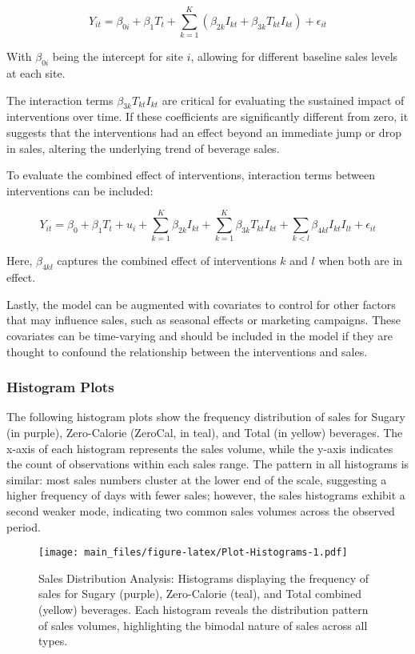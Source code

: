 \documentclass[
]{article}
\begin{document}
\[Y_{it} = \beta_{0i} + \beta_1 T_t + \sum_{k=1}^{K} (\beta_{2k} I_{kt} + \beta_{3k} T_{kt} I_{kt}) + \epsilon_{it} \]

With \(\beta_{0i}\) being the intercept for site \(i\), allowing for
different baseline sales levels at each site.

The interaction terms \(\beta_{3k} T_{kt} I_{kt}\) are critical for
evaluating the sustained impact of interventions over time. If these
coefficients are significantly different from zero, it suggests that the
interventions had an effect beyond an immediate jump or drop in sales,
altering the underlying trend of beverage sales.

To evaluate the combined effect of interventions, interaction terms
between interventions can be included:

\[Y_{it} = \beta_0 + \beta_1 T_t + u_i + \sum_{k=1}^{K} \beta_{2k} I_{kt} + \sum_{k=1}^{K} \beta_{3k} T_{kt} I_{kt} + \sum_{k<l} \beta_{4kl} I_{kt} I_{lt} + \epsilon_{it} \]

Here, \(\beta_{4kl}\) captures the combined effect of interventions
\(k\) and \(l\) when both are in effect.

Lastly, the model can be augmented with covariates to control for other
factors that may influence sales, such as seasonal effects or marketing
campaigns. These covariates can be time-varying and should be included
in the model if they are thought to confound the relationship between
the interventions and sales.

\hypertarget{histogram-plots}{%
\subsubsection{Histogram Plots}\label{histogram-plots}}

The following histogram plots show the frequency distribution of sales
for Sugary (in purple), Zero-Calorie (ZeroCal, in teal), and Total (in
yellow) beverages. The x-axis of each histogram represents the sales
volume, while the y-axis indicates the count of observations within each
sales range. The pattern in all histograms is similar: most sales
numbers cluster at the lower end of the scale, suggesting a higher
frequency of days with fewer sales; however, the sales histograms
exhibit a second weaker mode, indicating two common sales volumes across
the observed period.

\begin{figure}
\centering
\texttt{[image: main\_files/figure-latex/Plot-Histograms-1.pdf]}
\caption{Sales Distribution Analysis: Histograms displaying the
frequency of sales for Sugary (purple), Zero-Calorie (teal), and Total
combined (yellow) beverages. Each histogram reveals the distribution
pattern of sales volumes, highlighting the bimodal nature of sales
across all types.}
\end{figure}
\end{document}
